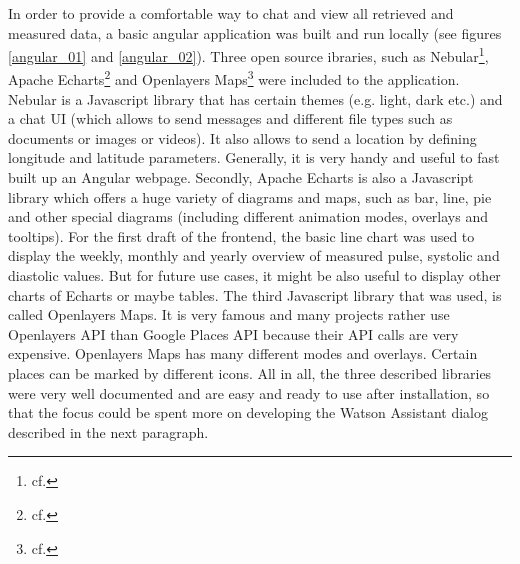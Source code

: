 In order to provide a comfortable way to chat and view all retrieved and measured data, a basic angular application was built and run locally (see figures \ref{angular_01} and \ref{angular_02}). Three open source ibraries, such as Nebular\footnote{cf.\autocite{nebular}}, Apache Echarts\footnote{cf.\autocite{echarts}} and Openlayers Maps\footnote{cf.\autocite{openlayers}} were included to the application. Nebular is a Javascript library that has certain themes (e.g. light, dark etc.) and a chat UI (which allows to send messages and different file types such as documents or images or videos). It also allows to send a location by defining longitude and latitude parameters. Generally, it is very handy and useful to fast built up an Angular webpage.
Secondly, Apache Echarts is also a Javascript library which offers a huge variety of diagrams and maps, such as bar, line, pie and other special diagrams (including different animation modes, overlays and tooltips). For the first draft of the frontend, the basic line chart was used to display the weekly, monthly and yearly overview of measured pulse, systolic and diastolic values. But for future use cases, it might be also useful to display other charts of Echarts or maybe tables.
The third Javascript library that was used, is called Openlayers Maps. It is very famous and many projects rather use Openlayers API than Google Places API because their API calls are very expensive. Openlayers Maps has many different modes and overlays. Certain places can be marked by different icons.
All in all, the three described libraries were very well documented and are easy and ready to use after installation, so that the focus could be spent more on developing the Watson Assistant dialog described in the next paragraph.

